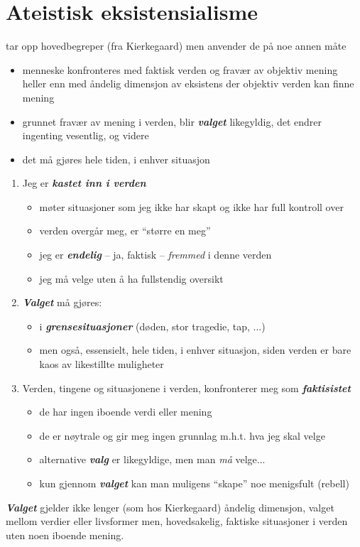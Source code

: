 \documentclass[12pt]{article}
\newcommand{\MyLPar}{\parsep -.2ex plus.2ex minus.2ex\itemsep\parsep
   \vspace{-\topsep}\vspace{.5ex}}
\newcommand{\co}[1]{{\bf\em #1\/}}
\newcommand{\ut}[1]{\\ \ \ .\dotfill{\small\bf #1}}
\begin{document}
\section{Ateistisk eksistensialisme}
tar opp hovedbegreper (fra Kierkegaard) men anvender de p{\aa} noe
annen m{\aa}te
\begin{itemize}\MyLPar
\item menneske konfronteres med faktisk verden og frav{\ae}r av objektiv mening
heller enn med {\aa}ndelig dimensjon av eksistens der objektiv verden kan
finne mening
\item grunnet frav{\ae}r av mening i verden, blir \co{valget} likegyldig, det
endrer ingenting vesentlig, og videre
\item det m{\aa} gj{\o}res hele tiden, i enhver situasjon
\end{itemize}

\begin{enumerate}\MyLPar
\item Jeg er \co{kastet inn i verden}
\begin{itemize}
\item
m{\o}ter situasjoner som jeg ikke har skapt og ikke har full kontroll
over
\item verden overg{\aa}r meg, er ``st{\o}rre en meg''
\item jeg er \co{endelig} -- ja, faktisk -- {\em fremmed} i denne verden
\item jeg m{\aa} velge uten {\aa} ha fullstendig oversikt
\end{itemize}
\item \co{Valget} m{\aa} gj{\o}res:
\begin{itemize}
\item i \co{grensesituasjoner} (d{\o}den, stor tragedie, tap, ...)
\item men ogs{\aa}, essensielt, hele tiden, i enhver situasjon, siden verden er
bare kaos av likestillte muligheter
\end{itemize}
\item Verden, tingene og situasjonene i verden, konfronterer meg som
\co{faktisistet}
\begin{itemize}
\item de har ingen iboende verdi eller mening
\item de er n{\o}ytrale og gir meg ingen grunnlag m.h.t. hva jeg skal velge
\item alternative \co{valg} er likegyldige, men man {\em m{\aa}} velge...
\item kun gjennom \co{valget} kan man muligens ``skape'' noe menigsfult (rebell)
\end{itemize}
\end{enumerate}
\co{Valget} gjelder ikke lenger (som hos Kierkegaard) {\aa}ndelig dimensjon, valget mellom verdier eller
livsformer men,
hovedsakelig, faktiske situasjoner i verden uten noen iboende mening.
\end{document}
